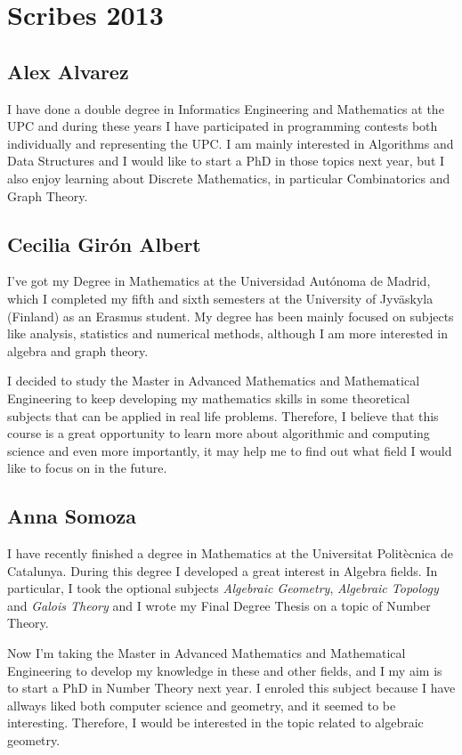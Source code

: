 \chapter*{Scribes 2013}

\section{Alex Alvarez}
I have done a double degree in Informatics Engineering and Mathematics at the UPC and during these years I have participated in programming contests both individually and representing the UPC. I am mainly interested in Algorithms and Data Structures and I would like to start a PhD in those topics next year, but I also enjoy learning about Discrete Mathematics, in particular Combinatorics and Graph Theory.


\section{Cecilia Gir\'on Albert}

I've got my Degree in Mathematics at the Universidad Aut\'onoma de Madrid, which I completed my fifth and sixth semesters 
at the University of Jyv\"askyla (Finland) as an Erasmus student. My degree has been mainly focused on subjects like 
analysis, statistics and numerical methods, although I am more interested in algebra and graph theory. 

I decided to study the Master in Advanced Mathematics and Mathematical Engineering to keep developing my mathematics skills 
in some theoretical subjects that can be applied in real life problems. Therefore, I believe that this course is a great 
opportunity to learn more about algorithmic and computing science and even more importantly, it may help me to find out 
what field I would like to focus on in the future.

\section{Anna Somoza}

I have recently finished a degree in Mathematics at the Universitat Polit\`ecnica de Catalunya. During this degree I developed a great interest in Algebra fields. In particular, I took the optional subjects \emph{Algebraic Geometry}, \emph{Algebraic Topology} and \emph{Galois Theory} and I wrote my Final Degree Thesis on a topic of Number Theory.

Now I'm taking the Master in Advanced Mathematics and Mathematical Engineering to develop my knowledge in these and other fields, and I my aim is to start a PhD in Number Theory next year. I enroled this subject because I have allways liked both computer science and geometry, and it seemed to be interesting. Therefore, I would be interested in the topic related to algebraic geometry.

